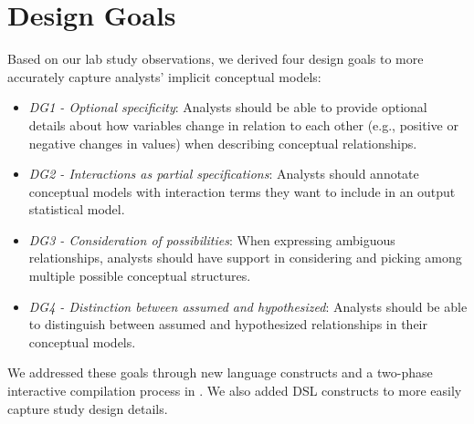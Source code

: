 \section{Design Goals} \label{sec:rtisane_design_implications} 
Based on our lab study observations, we derived four design goals to more accurately capture analysts' implicit
conceptual models: 

\def\optionalSpecificity{\textit{DG1 - Optional specificity}\xspace}
\def\interactionAsPartialSpec{\textit{DG2 - Interactions as partial specifications}\xspace}
\def\considerPossibilities{\textit{DG3 - Consideration of possibilities}\xspace}
\def\assumeHypothesize{\textit{DG4 - Distinction between assumed and hypothesized}\xspace}
\begin{itemize}
    \item \optionalSpecificity: Analysts should be able to provide optional
    details about how variables change in relation to each other (e.g., positive
    or negative changes in values) when describing conceptual relationships.
    \item \interactionAsPartialSpec: Analysts should annotate conceptual models with interaction terms they want to include in an output statistical model. 
    \item \considerPossibilities: When expressing ambiguous relationships, analysts should have support
    in considering and picking among multiple possible conceptual structures.
    \item \assumeHypothesize: Analysts should be able to distinguish between assumed and hypothesized relationships in their conceptual models. 
\end{itemize}

We addressed these goals through new language
constructs and a two-phase interactive compilation process in \rTisane. We also added DSL constructs to more easily capture
study design details. 

